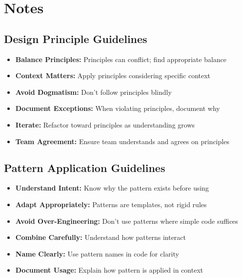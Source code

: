 \documentclass[11pt,letterpaper]{article}
\begin{document}
\section{Notes}

\subsection{Design Principle Guidelines}

\begin{principlebox}
\begin{itemize}[nosep]
    \item \textbf{Balance Principles:} Principles can conflict; find appropriate balance
    \item \textbf{Context Matters:} Apply principles considering specific context
    \item \textbf{Avoid Dogmatism:} Don't follow principles blindly
    \item \textbf{Document Exceptions:} When violating principles, document why
    \item \textbf{Iterate:} Refactor toward principles as understanding grows
    \item \textbf{Team Agreement:} Ensure team understands and agrees on principles
\end{itemize}
\end{principlebox}

\subsection{Pattern Application Guidelines}

\begin{patternbox}
\begin{itemize}[nosep]
    \item \textbf{Understand Intent:} Know why the pattern exists before using
    \item \textbf{Adapt Appropriately:} Patterns are templates, not rigid rules
    \item \textbf{Avoid Over-Engineering:} Don't use patterns where simple code suffices
    \item \textbf{Combine Carefully:} Understand how patterns interact
    \item \textbf{Name Clearly:} Use pattern names in code for clarity
    \item \textbf{Document Usage:} Explain how pattern is applied in context
\end{itemize}
\end{patternbox}
\end{document}
